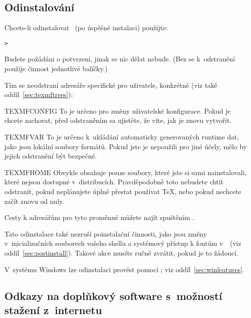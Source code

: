 \documentclass[\classoptions,slovak,english,czech]{\classname}
\begin{document}
\subsection{Odinstalování \TL}
\label{sec:uninstall}

Chcete-li odinstalovat \TL\ (po úspěšné instalaci) použijte: 

\begin{alltt}
	> 
\end{alltt}

Budete požádáni o potvrzení, jinak se nic dělat nebude.
(Bez  se k~odstranění použije činnost 
jednotlivé balíčky.) 

Tím se neodstraní adresáře specifické pro uživatele, konkrétně (viz také
oddíl~\ref{sec:texmftrees}): 

\begin{ttdescription}
\item [TEXMFCONFIG] To je určeno pro změny uživatelské konfigurace.
Pokud je chcete zachovat, před odstraněním sa ujistěte, že víte, jak je znovu vytvořit. 
	
\item [TEXMFVAR] To je určeno k~ukládání automaticky generovaných runtime dat, 
jako jsou lokální soubory formátů. Pokud jste je nepoužili
pro jiné účely, mělo by jejich odstranění být bezpečné. 
	
\item[TEXMFHOME] Obvykle obsahuje pouze soubory, které jste si sami nainstalovali,
které nejsou dostupné v~distribucích. Pravděpodobně toto nebudete chtít odstranit, pokud neplánujete úplně
přestat používat \TeX, nebo pokud nechcete začít znovu od nuly.
\end{ttdescription}

\noindent Cesty k adresářům pro tyto proměnné můžete najít spuštěním .

Tato odinstalace  také nezruší poinstalační
činnosti, jako jsou změny  v~inicializačních souborech vašeho shellu 
a systémový přístup k fontům v~\TL\ (viz oddíl~\ref{sec:postinstall}). 
Takové akce musíte ručně zvrátit, pokud je to žádoucí. 

V~systému Windows lze odinstalaci provést pomocí \GUI; viz
oddíl~\ref{sec:winfeatures}. 


\subsection{Odkazy na doplňkový software s~možností stažení z~internetu}
\end{document}
